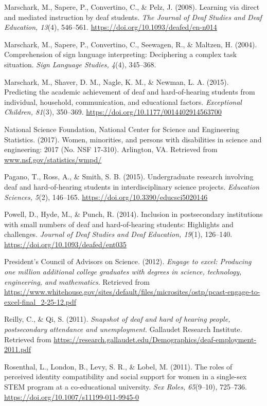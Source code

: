 \documentclass[11.5pt]{sig-alternate} %
\begin{document}
Marschark, M., Sapere, P., Convertino, C., \& Pelz, J. (2008). Learning via direct and mediated instruction by deaf students. \textit{The Journal of Deaf Studies and Deaf Education, 13}(4), 546–561. \url{https://doi.org/10.1093/deafed/en-n014}

Marschark, M., Sapere, P., Convertino, C., Seewagen, R., \& Maltzen, H. (2004). Comprehension of sign language interpreting: Deciphering a complex task situation. \textit{Sign Language Studies, 4}(4), 345–368.

Marschark, M., Shaver, D. M., Nagle, K. M., \& Newman, L. A. (2015). Predicting the academic achievement of deaf and hard-of-hearing students from individual, household, communication, and educational factors. \textit{Exceptional Children, 81}(3), 350–369. \url{https://doi.org/10.1177/0014402914563700}

National Science Foundation, National Center for Science and Engineering Statistics. (2017). Women, minorities, and persons with disabilities in science and engineering: 2017 (No. NSF 17-310). Arlington, VA. Retrieved from \url{www.nsf.gov/statistics/wmpd/}

Pagano, T., Ross, A., \& Smith, S. B. (2015). Undergraduate research involving deaf and hard-of-hearing students in interdisciplinary science projects. \textit{Education Sciences, 5}(2), 146–165. \url{https://doi.org/10.3390/educsci5020146}

Powell, D., Hyde, M., \& Punch, R. (2014). Inclusion in postsecondary institutions with small numbers of deaf and hard-of-hearing students: Highlights and challenges. \textit{Journal of Deaf Studies and Deaf Education, 19}(1), 126–140. \url{https://doi.org/10.1093/deafed/ent035}

President’s Council of Advisors on Science. (2012). \textit{Engage  to  excel:  Producing  one  million additional college graduates with degrees in  science,  technology,  engineering,  and mathematics}. Retrieved from \url{https://www.whitehouse.gov/sites/default/files/microsites/ostp/pcast-engage-to-excel-final_2-25-12.pdf}

Reilly, C., \& Qi, S. (2011). \textit{Snapshot of deaf and hard of hearing people, postsecondary attendance and unemployment}. Gallaudet Research Institute. Retrieved from \url{https://research.gallaudet.edu/Demographics/deaf-employment-2011.pdf}

Rosenthal, L., London, B., Levy, S. R., \& Lobel, M. (2011). The roles of perceived identity compatibility and social support for women in a single-sex STEM program at a co-educational university. \textit{Sex Roles, 65}(9–10), 725–736. \url{https://doi.org/10.1007/s11199-011-9945-0}
\end{document}
